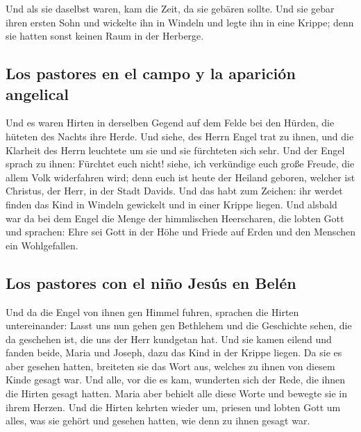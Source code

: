  Und als sie daselbst waren, kam die Zeit, da sie gebären
sollte.  Und sie gebar ihren ersten Sohn und wickelte ihn
in Windeln und legte ihn in eine Krippe; denn sie hatten sonst keinen
Raum in der Herberge.

\hypertarget{los-pastores-en-el-campo-y-la-apariciuxf3n-angelical}{%
\subsection{Los pastores en el campo y la aparición
angelical}\label{los-pastores-en-el-campo-y-la-apariciuxf3n-angelical}}

 Und es waren Hirten in derselben Gegend auf dem Felde bei
den Hürden, die hüteten des Nachts ihre Herde.  Und siehe,
des Herrn Engel trat zu ihnen, und die Klarheit des Herrn leuchtete um
sie und sie fürchteten sich sehr.  Und der Engel sprach
zu ihnen: Fürchtet euch nicht! siehe, ich verkündige euch große Freude,
die allem Volk widerfahren wird;  denn euch ist heute der
Heiland geboren, welcher ist Christus, der Herr, in der Stadt Davids.
 Und das habt zum Zeichen: ihr werdet finden das Kind in
Windeln gewickelt und in einer Krippe liegen.  Und
alsbald war da bei dem Engel die Menge der himmlischen Heerscharen, die
lobten Gott und sprachen:  Ehre sei Gott in der Höhe und
Friede auf Erden und den Menschen ein Wohlgefallen.

\hypertarget{los-pastores-con-el-niuxf1o-jesuxfas-en-beluxe9n}{%
\subsection{Los pastores con el niño Jesús en
Belén}\label{los-pastores-con-el-niuxf1o-jesuxfas-en-beluxe9n}}

 Und da die Engel von ihnen gen Himmel fuhren, sprachen
die Hirten untereinander: Lasst uns nun gehen gen Bethlehem und die
Geschichte sehen, die da geschehen ist, die uns der Herr kundgetan hat.
 Und sie kamen eilend und fanden beide, Maria und Joseph,
dazu das Kind in der Krippe liegen.  Da sie es aber
gesehen hatten, breiteten sie das Wort aus, welches zu ihnen von diesem
Kinde gesagt war.  Und alle, vor die es kam, wunderten
sich der Rede, die ihnen die Hirten gesagt hatten.  Maria
aber behielt alle diese Worte und bewegte sie in ihrem Herzen.
 Und die Hirten kehrten wieder um, priesen und lobten
Gott um alles, was sie gehört und gesehen hatten, wie denn zu ihnen
gesagt war.

